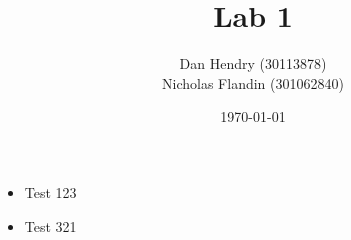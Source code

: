 \documentclass{enscStyle}
\title{Lab 1}
\date{\today}
\author{
	Dan Hendry (30113878) \\
	Nicholas Flandin (301062840) 
}
\begin{document}
\maketitle







\begin{itemize}
\item Test 123
\item Test 321
\end{itemize}







%


%
\end{document}

